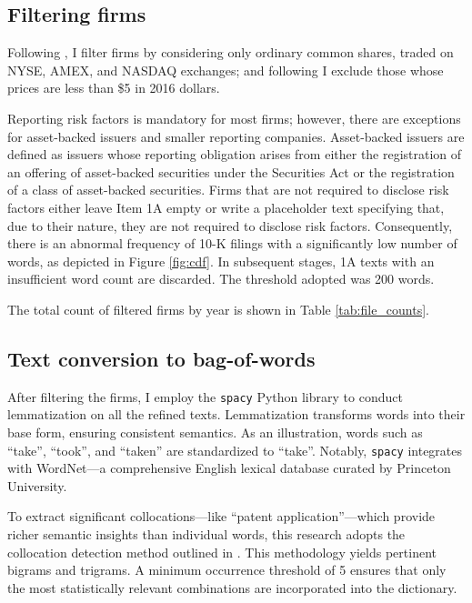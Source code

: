 \documentclass[12pt, letterpaper]{article}
\begin{document}
\subsection{Filtering firms}

Following \cite{Golubov2019-ku, Stambaugh2016-eb}, I filter firms by considering only ordinary common shares, traded on NYSE, AMEX, and NASDAQ exchanges; and following \cite{Stambaugh2016-eb} I exclude those whose prices are less than \$5 in 2016 dollars. 

Reporting risk factors is mandatory for most firms; however, there are exceptions for asset-backed issuers and smaller reporting companies. Asset-backed issuers are defined as issuers whose reporting obligation arises from either the registration of an offering of asset-backed securities under the Securities Act or the registration of a class of asset-backed securities. Firms that are not required to disclose risk factors either leave Item 1A empty or write a placeholder text specifying that, due to their nature, they are not required to disclose risk factors. Consequently, there is an abnormal frequency of 10-K filings with a significantly low number of words, as depicted in Figure \ref{fig:cdf}. In subsequent stages, 1A texts with an insufficient word count are discarded. The threshold adopted was 200 words. 

The total count of filtered firms by year is shown in Table \ref{tab:file_counts}.


 

\subsection{Text conversion to bag-of-words}

After filtering the firms, I employ the \texttt{spacy} Python library to conduct lemmatization on all the refined texts. Lemmatization transforms words into their base form, ensuring consistent semantics. As an illustration, words such as ``take'', ``took'', and ``taken'' are standardized to ``take''. Notably, \texttt{spacy} integrates with WordNet---a comprehensive English lexical database curated by Princeton University.

To extract significant collocations---like ``patent application''---which provide richer semantic insights than individual words, this research adopts the collocation detection method outlined in \cite{Mikolov2013-be}. This methodology yields pertinent bigrams and trigrams. A minimum occurrence threshold of 5 ensures that only the most statistically relevant combinations are incorporated into the dictionary.
\end{document}

